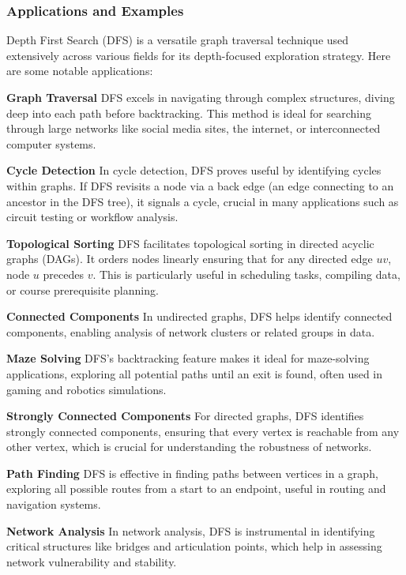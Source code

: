 \documentclass[12pt]{book} %
\begin{document}
\subsubsection{Applications and Examples}

Depth First Search (DFS) is a versatile graph traversal technique used extensively across various fields for its depth-focused exploration strategy. Here are some notable applications:

\textbf{Graph Traversal}
DFS excels in navigating through complex structures, diving deep into each path before backtracking. This method is ideal for searching through large networks like social media sites, the internet, or interconnected computer systems.

\textbf{Cycle Detection}
In cycle detection, DFS proves useful by identifying cycles within graphs. If DFS revisits a node via a back edge (an edge connecting to an ancestor in the DFS tree), it signals a cycle, crucial in many applications such as circuit testing or workflow analysis.

\textbf{Topological Sorting}
DFS facilitates topological sorting in directed acyclic graphs (DAGs). It orders nodes linearly ensuring that for any directed edge \(uv\), node \(u\) precedes \(v\). This is particularly useful in scheduling tasks, compiling data, or course prerequisite planning.

\textbf{Connected Components}
In undirected graphs, DFS helps identify connected components, enabling analysis of network clusters or related groups in data.

\textbf{Maze Solving}
DFS's backtracking feature makes it ideal for maze-solving applications, exploring all potential paths until an exit is found, often used in gaming and robotics simulations.

\textbf{Strongly Connected Components}
For directed graphs, DFS identifies strongly connected components, ensuring that every vertex is reachable from any other vertex, which is crucial for understanding the robustness of networks.

\textbf{Path Finding}
DFS is effective in finding paths between vertices in a graph, exploring all possible routes from a start to an endpoint, useful in routing and navigation systems.

\textbf{Network Analysis}
In network analysis, DFS is instrumental in identifying critical structures like bridges and articulation points, which help in assessing network vulnerability and stability.
\end{document}
